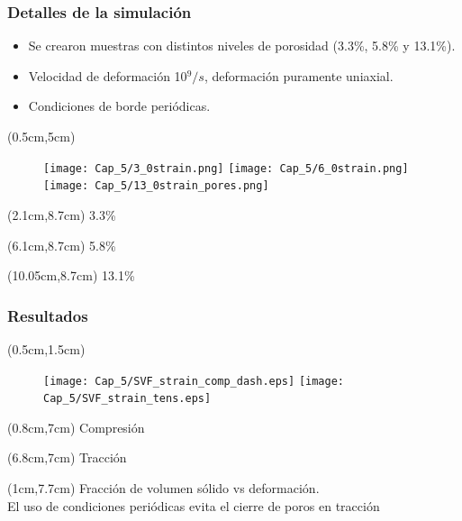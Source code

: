 \begin{frame}
    \frametitle{Detalles de la simulaci\'on}
    \vspace{0cm}
    \begin{itemize}
        \item Se crearon muestras con distintos niveles de porosidad (3.3\%, 5.8\% y 13.1\%).
        \item Velocidad de deformaci\'on 10$^9/s$, deformaci\'on puramente uniaxial.
        \item Condiciones de borde peri\'odicas.
    \end{itemize}
    \begin{textblock*}{12cm}(0.5cm,5cm)
      \begin{figure}[htp]
	\texttt{[image: Cap\_5/3\_0strain.png]}
	\texttt{[image: Cap\_5/6\_0strain.png]}
	\texttt{[image: Cap\_5/13\_0strain\_pores.png]}
      \end{figure}
    \end{textblock*}
    \begin{textblock*}{2cm}(2.1cm,8.7cm)
      \scriptsize{3.3\%}
    \end{textblock*}
    \begin{textblock*}{2cm}(6.1cm,8.7cm)
      \scriptsize{5.8\%}
    \end{textblock*}
    \begin{textblock*}{2cm}(10.05cm,8.7cm)
      \scriptsize{13.1\%}
    \end{textblock*}
\end{frame}

\begin{frame}
 \frametitle{Resultados}
 \begin{textblock*}{12cm}(0.5cm,1.5cm)
  \begin{figure}[htp]
      \texttt{[image: Cap\_5/SVF\_strain\_comp\_dash.eps]}
      \texttt{[image: Cap\_5/SVF\_strain\_tens.eps]}
  \end{figure}
 \end{textblock*}
 \begin{textblock*}{6cm}(0.8cm,7cm)
  \centering
  \scriptsize{Compresi\'on}
 \end{textblock*}
 \begin{textblock*}{6cm}(6.8cm,7cm)
  \centering
  \scriptsize{Tracci\'on}
 \end{textblock*}
  \begin{textblock*}{\textwidth}(1cm,7.7cm)
  \centering
  Fracci\'on de volumen s\'olido vs deformaci\'on.\\
  El uso de condiciones peri\'odicas evita el cierre de poros en tracci\'on
 \end{textblock*}
\end{frame}


